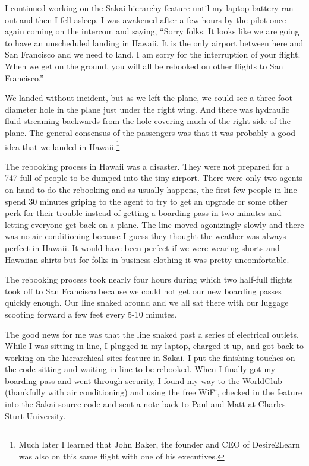 \documentclass[12pt]{book}
\begin{document}
I continued working on the Sakai hierarchy feature until my laptop battery ran out
and then I fell asleep.   I was awakened after a few hours by the pilot
once again coming on the intercom and saying, ``Sorry folks.  It looks like
we are going to have an unscheduled landing in Hawaii.  It is the only airport
between here and San Francisco and we need to land.  I am sorry for the
interruption of your flight.   When we get on the ground, you will all be rebooked
on other flights to San Francisco.''

We landed without incident, but as we left the plane, we could see a three-foot
diameter hole in the plane just under the right wing.   And there was hydraulic fluid
streaming backwards from the hole covering much of the right side of the plane.
The general consensus of the passengers was that it was probably a good idea that
we landed in Hawaii.\footnote{Much later I learned that John Baker, the founder and CEO
of Desire2Learn was also on this same flight with one of his executives.}

The rebooking process in Hawaii was a disaster.  They were not prepared for a 747 full
of people to be dumped into the tiny airport.   There were only two agents on hand to do the
rebooking and as usually happens, the first few people in line spend 30 minutes griping
to the agent to try to get an upgrade or some other perk for their trouble instead of
getting a boarding pass in two minutes and letting everyone get back on a plane.  The line
moved agonizingly slowly and there was no air conditioning because I guess they thought
the weather was always perfect in Hawaii.   It would have been perfect if we were
wearing shorts and Hawaiian shirts but for folks in business clothing it was
pretty uncomfortable.

The rebooking process took nearly four hours during which two half-full flights
took off to San Francisco because we could not get our new boarding passes quickly enough.
Our line snaked around and we all sat there with our luggage scooting forward a few feet
every 5-10 minutes.

The good news for me was that the line snaked past a series of electrical outlets.
While I was sitting in line, I plugged in my laptop, charged it up, and got back to working on
the hierarchical sites feature in Sakai.   I put the finishing
touches on the code sitting and waiting in line to be rebooked.  When I finally
got my boarding pass and went through security, I found my way to the WorldClub (thankfully
with air conditioning) and using the free WiFi, checked in the feature into the Sakai source
code and sent a note back to Paul and Matt at Charles Sturt University.
\end{document}
